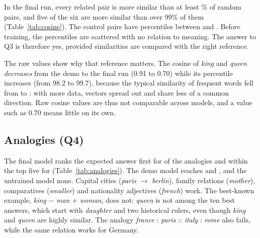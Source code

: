 In the final run, every related pair is more similar than at least \FinalRelatedPctMin\% of random pairs, and five of the six are more similar than over 99\% of them (Table~\ref{tab:cosine}). The control pairs have percentiles between \FinalControlPctMin{} and \FinalControlPctMax. Before training, the percentiles are scattered with no relation to meaning. The answer to Q3 is therefore yes, provided similarities are compared with the right reference.

The raw values show why that reference matters. The cosine of \textit{king} and \textit{queen} \emph{decreases} from the demo to the final run (0.91 to 0.70) while its percentile increases (from 98.2 to 99.7), because the typical similarity of frequent words fell from \DemoBaselineMean{} to \FinalBaselineMean{}: with more data, vectors spread out and share less of a common direction. Raw cosine values are thus not comparable across models, and a value such as 0.70 means little on its own.

\subsection{Analogies (Q4)}

\begin{table}[t]
    \centering
    \small
    \setlength{\tabcolsep}{4.5pt}
    
    \caption{Analogies $a : b :: c : ?$ answered by the nearest word to $\mathbf{v}_b - \mathbf{v}_a + \mathbf{v}_c$. Rank of the expected answer among the ten best candidates ($>$10: not among them).}
    \label{tab:analogies}
\end{table}

The final model ranks the expected answer first for \FinalHitOne{} of the \FinalAnswerable{} analogies and within the top five for \FinalHitFive{} (Table~\ref{tab:analogies}). The demo model reaches \DemoHitOne{} and \DemoHitFive, and the untrained model none. Capital cities (\textit{paris} $\to$ \textit{berlin}), family relations (\textit{mother}), comparatives (\textit{smaller}) and nationality adjectives (\textit{french}) work. The best-known example, \textit{king} $-$ \textit{man} $+$ \textit{woman}, does not: \textit{queen} is not among the ten best answers, which start with \textit{daughter} and two historical rulers, even though \textit{king} and \textit{queen} are highly similar. The analogy \textit{france} : \textit{paris} :: \textit{italy} : \textit{rome} also fails, while the same relation works for Germany.

